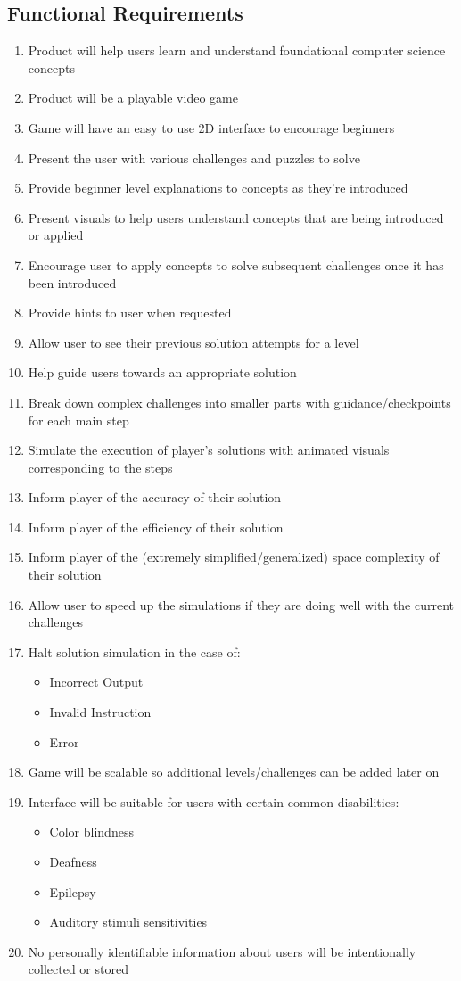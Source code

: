 \subsection{Functional Requirements}
\begin{enumerate}
	\item Product will help users learn and understand foundational computer science 
		concepts
	\item Product will be a playable video game
	\item Game will have an easy to use 2D interface to encourage beginners
	\item Present the user with various challenges and puzzles to solve
	\item Provide beginner level explanations to concepts as they’re introduced
	\item Present visuals to help users understand concepts that are being
		introduced or applied
	\item Encourage user to apply concepts to solve subsequent challenges once it has
		been introduced
	\item Provide hints to user when requested
	\item Allow user to see their previous solution attempts for a level
	\item Help guide users towards an appropriate solution
	\item Break down complex challenges into smaller parts with guidance/checkpoints 
		for each main step
	\item Simulate the execution of player’s solutions with animated visuals
		corresponding to the steps
	\item Inform player of the accuracy of their solution
	\item Inform player of the efficiency of their solution
	\item Inform player of the (extremely simplified/generalized) space complexity of their solution
	\item Allow user to speed up the simulations if they are doing well with the
		current challenges
	\item Halt solution simulation in the case of:
		\begin{itemize}
		\item Incorrect Output
		\item Invalid Instruction
		\item Error
		\end{itemize}
	\item Game will be scalable so additional levels/challenges can be added later on
	\item Interface will be suitable for users with certain common disabilities:
		\begin{itemize}
		\item Color blindness
		\item Deafness
		\item Epilepsy
		\item Auditory stimuli sensitivities
		\end{itemize}
	\item No personally identifiable information about users will be intentionally 
		collected or stored
\end{enumerate}

